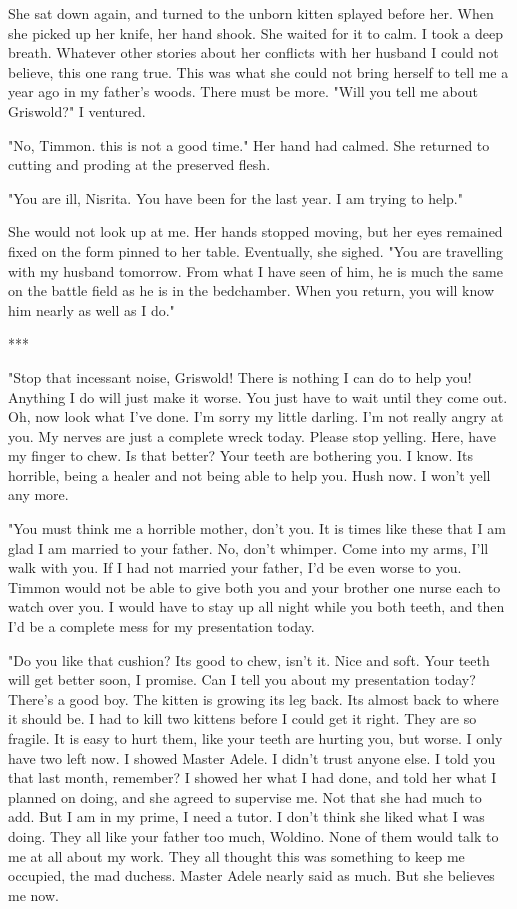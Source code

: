 \documentclass{article}
\begin{document}
She sat down again, and turned to the unborn kitten splayed before her. When she picked up her knife, her hand shook. She waited for it to calm. I took a deep breath. Whatever other stories about her conflicts with her husband I could not believe, this one rang true. This was what she could not bring herself to tell me a year ago in my father's woods. There must be more. "Will you tell me about Griswold?" I ventured.

"No, Timmon. this is not a good time." Her hand had calmed. She returned to cutting and proding at the preserved flesh.

"You are ill, Nisrita. You have been for the last year. I am trying to help." 

She would not look up at me. Her hands stopped moving, but her eyes remained fixed on the form pinned to her table. Eventually, she sighed. "You are travelling with my husband tomorrow. From what I have seen of him, he is much the same on the battle field as he is in the bedchamber. When you return, you will know him nearly as well as I do."

***

"Stop that incessant noise, Griswold! There is nothing I can do to help you! Anything I do will just make it worse. You just have to wait until they come out. Oh, now look what I've done. I'm sorry my little darling. I'm not really angry at you. My nerves are just a complete wreck today. Please stop yelling. Here, have my finger to chew. Is that better? Your teeth are bothering you. I know. Its horrible, being a healer and not being able to help you. Hush now. I won't yell any more.

"You must think me a horrible mother, don't you. It is times like these that I am glad I am married to your father. No, don't whimper. Come into my arms, I'll walk with you. If I had not married your father, I'd be even worse to you. Timmon would not be able to give both you and your brother one nurse each to watch over you. I would have to stay up all night while you both teeth, and then I'd be a complete mess for my presentation today.

"Do you like that cushion? Its good to chew, isn't it. Nice and soft. Your teeth will get better soon, I promise. Can I tell you about my presentation today? There's a good boy. The kitten is growing its leg back. Its almost back to where it should be. I had to kill two kittens before I could get it right. They are so fragile. It is easy to hurt them, like your teeth are hurting you, but worse. I only have two left now. I showed Master Adele. I didn't trust anyone else. I told you that last month, remember? I showed her what I had done, and told her what I planned on doing, and she agreed to supervise me. Not that she had much to add. But I am in my prime, I need a tutor. I don't think she liked what I was doing. They all like your father too much, Woldino. None of them would talk to me at all about my work. They all thought this was something to keep me occupied, the mad duchess. Master Adele nearly said as much. But she believes me now.
\end{document}
